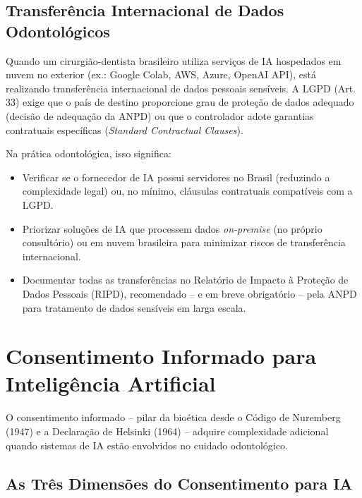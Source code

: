 \subsection{Transferência Internacional de Dados Odontológicos}

Quando um cirurgião-dentista brasileiro utiliza serviços de IA hospedados em
nuvem no exterior (ex.: Google Colab, AWS, Azure, OpenAI API), está realizando
transferência internacional de dados pessoais sensíveis. A LGPD (Art. 33) exige
que o país de destino proporcione grau de proteção de dados adequado (decisão
de adequação da ANPD) ou que o controlador adote garantias contratuais
específicas (\textit{Standard Contractual Clauses}).

Na prática odontológica, isso significa:

\begin{itemize}
  \item Verificar se o fornecedor de IA possui servidores no Brasil (reduzindo
    a complexidade legal) ou, no mínimo, cláusulas contratuais compatíveis com
    a LGPD.
  \item Priorizar soluções de IA que processem dados \textit{on-premise} (no
    próprio consultório) ou em nuvem brasileira para minimizar riscos de
    transferência internacional.
  \item Documentar todas as transferências no Relatório de Impacto à Proteção
    de Dados Pessoais (RIPD), recomendado -- e em breve obrigatório -- pela
    ANPD para tratamento de dados sensíveis em larga escala.
\end{itemize}


\section{Consentimento Informado para Inteligência Artificial}
\label{sec:consentimento-ia}

\nivelquatro

O consentimento informado -- pilar da bioética desde o Código de Nuremberg
(1947) e a Declaração de Helsinki (1964) -- adquire complexidade adicional
quando sistemas de IA estão envolvidos no cuidado odontológico.

\subsection{As Três Dimensões do Consentimento para IA}

